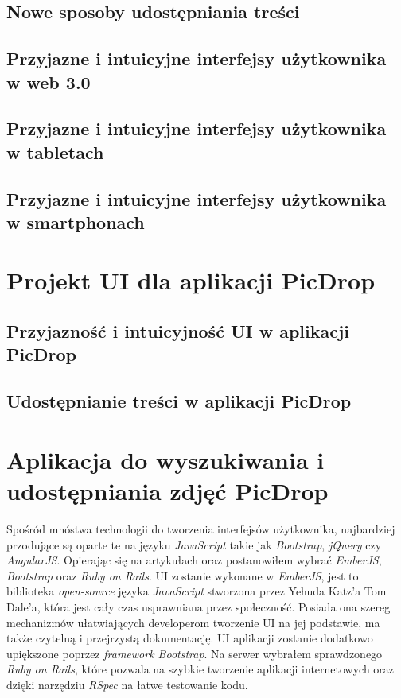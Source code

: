 \documentclass[brudnopis]{xmgr}
\begin{document}
\section{Nowe sposoby udostępniania treści}

\section{Przyjazne i intuicyjne interfejsy użytkownika\\ w web 3.0}

\section{Przyjazne i intuicyjne interfejsy użytkownika\\ w tabletach}

\section{Przyjazne i intuicyjne interfejsy użytkownika\\ w smartphonach}

\chapter{Projekt UI dla aplikacji PicDrop}

\section{Przyjazność i intuicyjność  UI w aplikacji PicDrop}

\section{Udostępnianie treści w aplikacji PicDrop}

\chapter{Aplikacja do wyszukiwania i udostępniania zdjęć PicDrop}

Spośród mnóstwa technologii do tworzenia interfejsów użytkownika, najbardziej przodujące są oparte te na języku \textit{JavaScript} takie jak \textit{Bootstrap},\textit{ jQuery} czy\\ \textit{AngularJS}. Opierając się na artykułach \cite{adamAnderson} oraz \cite{angularRailsBootstrap} postanowiłem wybrać \textit{EmberJS}, \textit{Bootstrap} oraz \textit{Ruby on Rails}. UI zostanie wykonane w \textit{EmberJS}, jest to  biblioteka  \textit{open-source} języka \textit{JavaScript} stworzona  przez  Yehuda Katz'a  Tom Dale'a, która jest cały czas usprawniana przez społeczność. Posiada ona szereg mechanizmów ułatwiających developerom tworzenie UI na jej podstawie, ma także czytelną i przejrzystą dokumentację. UI aplikacji zostanie dodatkowo upiększone poprzez \textit{framework Bootstrap}. Na serwer  wybrałem sprawdzonego \textit{Ruby on Rails}, które pozwala na szybkie tworzenie aplikacji internetowych oraz dzięki narzędziu \textit{RSpec} na łatwe testowanie kodu. 
\end{document}
